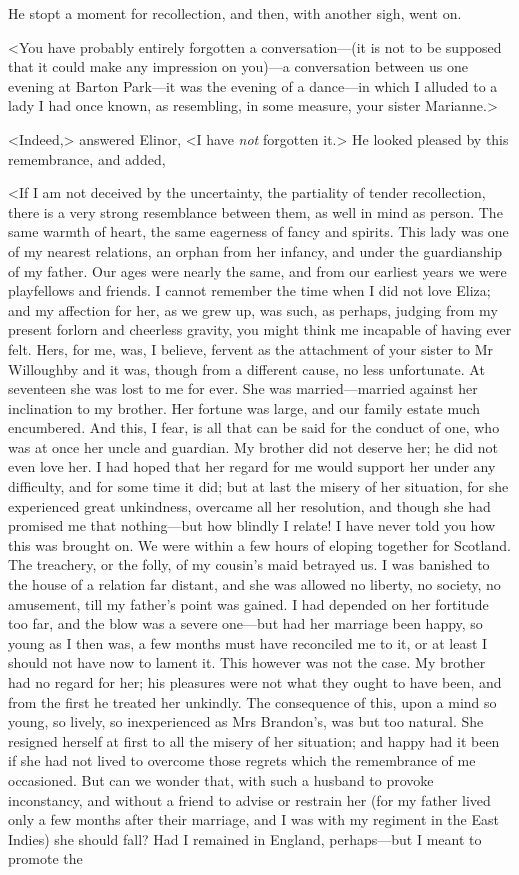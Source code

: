 He stopt a moment for recollection, and then, with another sigh, went on.

<You have probably entirely forgotten a conversation—(it is not to be supposed that it could make any impression on you)—a conversation between us one evening at Barton Park—it was the evening of a dance—in which I alluded to a lady I had once known, as resembling, in some measure, your sister Marianne.>

<Indeed,> answered Elinor, <I have \textit{not} forgotten it.> He looked pleased by this remembrance, and added,

<If I am not deceived by the uncertainty, the partiality of tender recollection, there is a very strong resemblance between them, as well in mind as person. The same warmth of heart, the same eagerness of fancy and spirits. This lady was one of my nearest relations, an orphan from her infancy, and under the guardianship of my father. Our ages were nearly the same, and from our earliest years we were playfellows and friends. I cannot remember the time when I did not love Eliza; and my affection for her, as we grew up, was such, as perhaps, judging from my present forlorn and cheerless gravity, you might think me incapable of having ever felt. Hers, for me, was, I believe, fervent as the attachment of your sister to Mr Willoughby and it was, though from a different cause, no less unfortunate. At seventeen she was lost to me for ever. She was married—married against her inclination to my brother. Her fortune was large, and our family estate much encumbered. And this, I fear, is all that can be said for the conduct of one, who was at once her uncle and guardian. My brother did not deserve her; he did not even love her. I had hoped that her regard for me would support her under any difficulty, and for some time it did; but at last the misery of her situation, for she experienced great unkindness, overcame all her resolution, and though she had promised me that nothing—but how blindly I relate! I have never told you how this was brought on. We were within a few hours of eloping together for Scotland. The treachery, or the folly, of my cousin's maid betrayed us. I was banished to the house of a relation far distant, and she was allowed no liberty, no society, no amusement, till my father's point was gained. I had depended on her fortitude too far, and the blow was a severe one—but had her marriage been happy, so young as I then was, a few months must have reconciled me to it, or at least I should not have now to lament it. This however was not the case. My brother had no regard for her; his pleasures were not what they ought to have been, and from the first he treated her unkindly. The consequence of this, upon a mind so young, so lively, so inexperienced as Mrs Brandon's, was but too natural. She resigned herself at first to all the misery of her situation; and happy had it been if she had not lived to overcome those regrets which the remembrance of me occasioned. But can we wonder that, with such a husband to provoke inconstancy, and without a friend to advise or restrain her (for my father lived only a few months after their marriage, and I was with my regiment in the East Indies) she should fall? Had I remained in England, perhaps—but I meant to promote the 